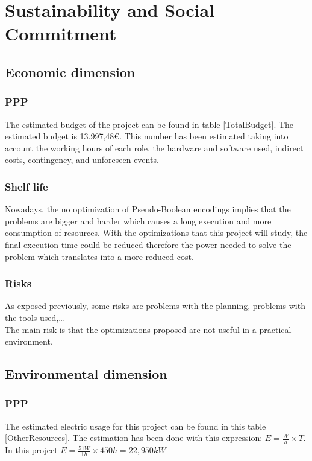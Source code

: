 \chapter{Sustainability and Social Commitment}
\label{Chapter5}

\section{Economic dimension}

\subsection{PPP}
The estimated budget of the project can be found in table \ref{TotalBudget}. The estimated budget is 13.997,48€. This number has been estimated taking into account the working hours of each role, the hardware and software used, indirect costs, contingency, and unforeseen events. 
\subsection{Shelf life}
Nowadays, the no optimization of Pseudo-Boolean encodings implies that the problems are bigger and harder which causes a long execution and more consumption of resources. With the optimizations that this project will study, the final execution time could be reduced therefore the power needed to solve the problem which translates into a more reduced cost.

\subsection{Risks}
As exposed previously, some risks are problems with the planning, problems with the tools used,\ldots\\
The main risk is that the optimizations proposed are not useful in a practical environment. 

\section{Environmental dimension }
\subsection{PPP}
The estimated electric usage for this project can be found in this table \ref{OtherResources}. The estimation has been done with this expression: $E=\frac{W}{h} \times T$. In this project $E=\frac{51W}{1h}\times 450h = 22,950kW$\\

